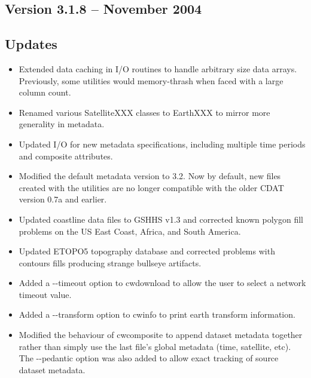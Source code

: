 
\subsection*{Version 3.1.8 -- November 2004}

\subsection*{Updates}
\begin{itemize}

  \item Extended data caching in I/O routines to handle arbitrary size
  data arrays. Previously, some utilities would memory-thrash when
  faced with a large column count.

  \item Renamed various SatelliteXXX classes to EarthXXX to mirror
  more generality in metadata.

  \item Updated I/O for new metadata specifications, including
  multiple time periods and composite attributes.

  \item Modified the default metadata version to 3.2. Now by default,
  new files created with the utilities are no longer compatible with
  the older CDAT version 0.7a and earlier.

  \item Updated coastline data files to GSHHS v1.3 and corrected known
  polygon fill problems on the US East Coast, Africa, and South
  America.

  \item Updated ETOPO5 topography database and corrected problems with
  contours fills producing strange bullseye artifacts.

  \item Added a -{-}timeout option to cwdownload to allow the user to
  select a network timeout value.

  \item Added a -{-}transform option to cwinfo to print earth transform
  information.

  \item Modified the behaviour of cwcomposite to append dataset
  metadata together rather than simply use the last file's global
  metadata (time, satellite, etc). The -{-}pedantic option was also
  added to allow exact tracking of source dataset metadata.


\end{itemize}
